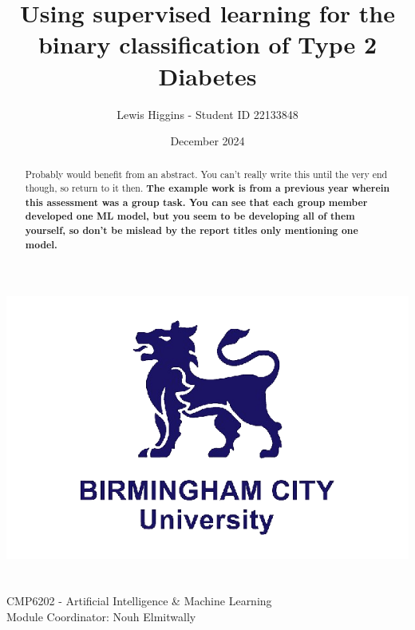\documentclass[12pt]{report}
\title{Using supervised learning for the binary classification of Type 2 Diabetes}
\author{Lewis Higgins - Student ID 22133848}
\date{December 2024}
\begin{document}
\makeatletter
\begin{titlepage}
    \begin{center}
        \includegraphics[width=0.7\linewidth]{BCU}\\[4ex]
        {\huge \bfseries  \@title}\\[50ex]
        {\@author}\\[2ex]
        {CMP6202 - Artificial Intelligence \& Machine Learning}\\[2ex]
        {Module Coordinator: Nouh Elmitwally}\\[10ex]
    \end{center}
\end{titlepage}
\makeatother
\thispagestyle{empty}
\newpage


\setcounter{page}{0}


\tableofcontents
\thispagestyle{empty}

\pagecolor{yellow}
\begin{abstract}
    Probably would benefit from an abstract. You can't really write this until the very end though,
    so return to it then. \textbf{The example work is from a previous year wherein this assessment was a group task.
    You can see that each group member developed one ML model, but you seem to be developing all of them yourself, so don't be mislead
    by the report titles only mentioning one model.}
\end{abstract}
\pagecolor{white}
\end{document}
